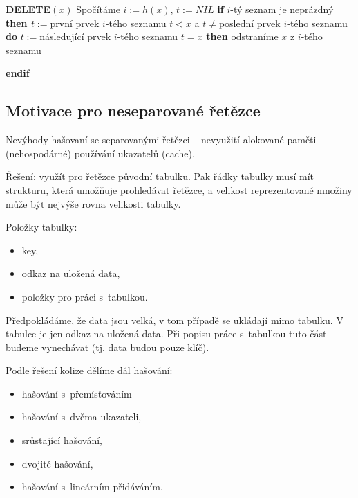 \documentclass[a4paper,12pt]{article}
\newcommand{\algoritmus}[1]{
  {
  \setlength\fboxrule{0.5pt}

  \begin{boxedminipage}{0.8\textwidth}

 #1
  \end{boxedminipage}

  }
  }
\begin{document}
{}\algoritmus{

{\bf DELETE$(x)$}\newline 
Spočítáme $i:=h(x)$, $t:=NIL$\newline
{\bf \textsf{if}} $i$-tý seznam je neprázdný {\bf \textsf{then}\newline 
\phantom{{\rm ---}}$t:=$}první prvek $i$-tého seznamu\newline 
\phantom{---}{\bf \textsf{while}} $t<x$ a $t\ne$poslední prvek $i$-tého seznamu {\bf \textsf{do}}\newline 
\phantom{------}$t:=$následující prvek $i$-tého seznamu\newline 
\phantom{---}{\bf \textsf{enddo}\newline 
\textsf{endif}\newline 
\textsf{if}} $t=x$ {\bf \textsf{then}} odstraníme $x$ z $i$-tého seznamu {\bf \textsf{endif}

}

}

\subsection{Motivace pro neseparované řetězce}
Nevýhody hašovaní se separovanými řetězci --\newline 
\phantom{---}nevyužití alokované paměti (nehospodárné)\newline 
\phantom{---}používání ukazatelů (cache).\newline 

Řešení: využít pro řetězce původní tabulku. Pak řádky tabulky musí mít strukturu, která umožňuje prohledávat řetězce, a velikost reprezentované množiny 
může být nejvýše rovna velikosti tabulky.  

Položky tabulky:
\begin{itemize}
\item key,
\item odkaz na uložená data,
\item položky pro práci s~tabulkou.
\end{itemize}

Předpokládáme, že data jsou velká, v tom případě se 
ukládají mimo tabulku. V tabulce je jen odkaz na uložená data. 
Při popisu práce s~tabulkou tuto část budeme vynechávat (tj. 
data budou pouze klíč).

Podle řešení kolize dělíme dál hašování:
\begin{itemize}
\item 
hašování s~přemísťováním
\item hašování s~dvěma 
ukazateli, 
\item 
srůstající hašování,
\item 
dvojité hašování,
\item hašování s~lineárním 
přidáváním.
\end{itemize}
\end{document}
